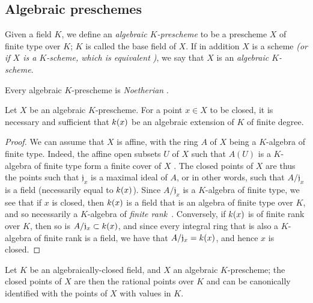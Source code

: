 \subsection{Algebraic preschemes}
\label{subsection:I.6.4}

\begin{definition}[6.4.1]
\label{I.6.4.1}
Given a field $K$, we define an \emph{algebraic $K$-prescheme} to be a prescheme $X$ of finite type over $K$; $K$ is called the base field of $X$.
If in addition $X$ is a scheme \emph{(or if $X$ is a \emph{$K$-scheme}, which is equivalent )}, we say that $X$ is an \emph{algebraic $K$-scheme}.
\end{definition}

Every algebraic $K$-prescheme is \emph{Noetherian} .

\begin{proposition}[6.4.2]
\label{I.6.4.2}
Let $X$ be an algebraic $K$-prescheme.
For a point $x\in X$ to be closed, it is necessary and sufficient that $k(x)$ be an algebraic extension of $K$ of finite degree.
\end{proposition}

\begin{proof}
\label{proof-1.6.4.2}
We can assume that $X$ is affine, with the ring $A$ of $X$ being a $K$-algebra of finite type.
Indeed, the affine open subsets $U$ of $X$ such that $A(U)$ is a $K$-algebra of finite type form a finite cover of $X$ .
The closed points of $X$ are thus the points such that $\mathfrak{j}_x$ is a
maximal ideal of $A$, or in other words, such that $A/\mathfrak{j}_x$ is a field (necessarily equal to $k(x)$).
Since $A/\mathfrak{j}_x$ is a $K$-algebra of finite type, we see that if $x$ is closed, then $k(x)$ is a field that is an algebra of finite type over $K$, and so necessarily a $K$-algebra of \emph{finite rank}~\cite{I-21}.
Conversely, if $k(x)$ is of finite rank over $K$, then so is $A/\mathfrak{j}_x\subset k(x)$, and since every integral ring that is also a $K$-algebra of finite rank is a field, we have that $A/\mathfrak{j}_x=k(x)$, and hence $x$ is closed.
\end{proof}

\begin{corollary}[6.4.3]
\label{I.6.4.3}
Let $K$ be an algebraically-closed field, and $X$ an algebraic $K$-prescheme; the closed points of $X$ are then the rational points over $K$  and can be canonically identified with the points of $X$ with values in $K$.
\end{corollary}

